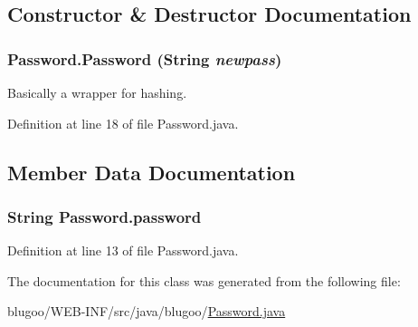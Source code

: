 \subsection{Constructor \& Destructor Documentation}
\hypertarget{classPassword_30315fdcd4e24e1970bf8510cd994efc}{
\subsubsection{\setlength{\rightskip}{0pt plus 5cm}Password.Password (String {\em newpass})}}
\label{classPassword_30315fdcd4e24e1970bf8510cd994efc}


Basically a wrapper for hashing. 



Definition at line 18 of file Password.java.

\subsection{Member Data Documentation}
\hypertarget{classPassword_99e20643579188f9248b9ed1b9083bda}{
\subsubsection{\setlength{\rightskip}{0pt plus 5cm}String {\bf Password.password}}}
\label{classPassword_99e20643579188f9248b9ed1b9083bda}




Definition at line 13 of file Password.java.

The documentation for this class was generated from the following file:\begin{CompactItemize}
\item 
blugoo/WEB-INF/src/java/blugoo/\hyperlink{Password_8java}{Password.java}\end{CompactItemize}
